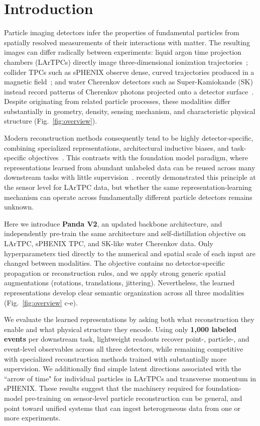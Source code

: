 \section{Introduction}
\label{sec:intro}

Particle imaging detectors infer the properties of fundamental particles from spatially resolved measurements of their interactions with matter. The resulting images can differ radically between experiments: liquid argon time projection chambers (LArTPCs) directly image three-dimensional ionization trajectories~\citep{Abi2020}; collider TPCs such as sPHENIX observe dense, curved trajectories produced in a magnetic field~\citep{klest2022compacttpc}; and water Cherenkov detectors such as Super-Kamiokande (SK) instead record patterns of Cherenkov photons projected onto a detector surface~\citep{fukuda2003superkamiokande}. Despite originating from related particle processes, these modalities differ substantially in geometry, density, sensing mechanism, and characteristic physical structure (Fig.~\ref{fig:overview}).

Modern reconstruction methods consequently tend to be highly detector-specific, combining specialized representations, architectural inductive biases, and task-specific objectives~\citep{Acciarri2018,Abratenko_2022,drielsma2021scalableendtoenddeeplearningbaseddata,park2025fm4npp}. This contrasts with the foundation model paradigm, where representations learned from abundant unlabeled data can be reused across many downstream tasks with little supervision~\citep{oquab2024dinov2learningrobustvisual,wu2025sonataselfsupervisedlearningreliable}. \cite{panda} recently demonstrated this principle at the sensor level for LArTPC data, but whether the same representation-learning mechanism can operate across fundamentally different particle detectors remains unknown.

Here we introduce \textbf{Panda V2}, an updated backbone architecture, and independently pre-train the same architecture and self-distillation objective on LArTPC, sPHENIX TPC, and SK-like water Cherenkov data. Only hyperparameters tied directly to the numerical and spatial scale of each input are changed between modalities. The objective contains no detector-specific propagation or reconstruction rules, and we apply strong generic spatial augmentations (rotations, translations, jittering). Nevertheless, the learned representations develop clear semantic organization across all three modalities (Fig.~\ref{fig:overview} c-e).

We evaluate the learned representations by asking both {what reconstruction they enable} and {what physical structure they encode}. Using only \textbf{1,000 labeled events} per downstream task, lightweight readouts recover point-, particle-, and event-level observables across all three detectors, while remaining competitive with specialized reconstruction methods trained with substantially more supervision. We additionally find simple latent directions associated with the ``arrow of time" for individual particles in LArTPCs and transverse momentum in sPHENIX. These results suggest that the machinery required for foundation-model pre-training on sensor-level particle reconstruction can be general, and point toward unified systems that can ingest heterogeneous data from one or more experiments.
